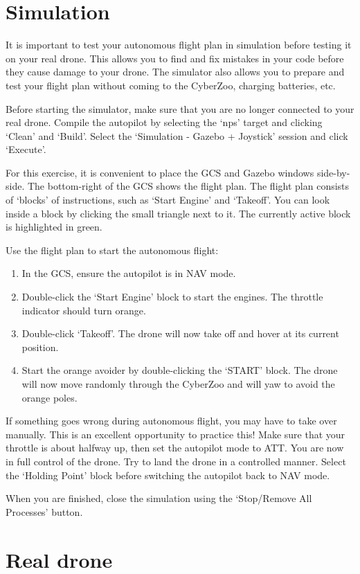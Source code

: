 \documentclass{article}
\begin{document}
\section{Simulation}
It is important to test your autonomous flight plan in simulation before testing it on your real drone. This allows you to find and fix mistakes in your code before they cause damage to your drone. The simulator also allows you to prepare and test your flight plan without coming to the CyberZoo, charging batteries, etc.


Before starting the simulator, make sure that you are no longer connected to your real drone.
Compile the autopilot by selecting the `nps' target and clicking `Clean' and `Build'. Select the `Simulation - Gazebo + Joystick' session and click `Execute'.


For this exercise, it is convenient to place the GCS and Gazebo windows side-by-side.
The bottom-right of the GCS shows the flight plan. The flight plan consists of `blocks' of instructions, such as `Start Engine' and `Takeoff'. You can look inside a block by clicking the small triangle next to it. The currently active block is highlighted in green.

Use the flight plan to start the autonomous flight:
\begin{enumerate}
\item In the GCS, ensure the autopilot is in NAV mode.
\item Double-click the `Start Engine' block to start the engines. The throttle indicator should turn orange.
\item Double-click `Takeoff'. The drone will now take off and hover at its current position.
\item Start the orange avoider by double-clicking the `START' block. The drone will now move randomly through the CyberZoo and will yaw to avoid the orange poles.
\end{enumerate}


If something goes wrong during autonomous flight, you may have to take over manually. This is an excellent opportunity to practice this!
Make sure that your throttle is about halfway up, then set the autopilot mode to ATT. You are now in full control of the drone. Try to land the drone in a controlled manner. Select the `Holding Point' block before switching the autopilot back to NAV mode.


When you are finished, close the simulation using the `Stop/Remove All Processes' button.


\section{Real drone}
\end{document}
